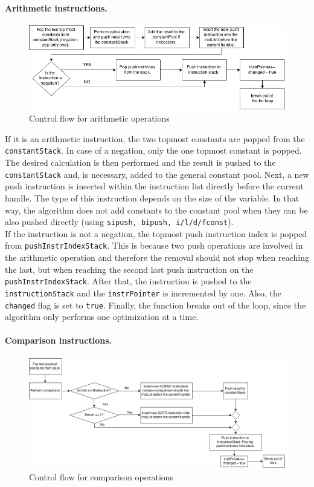 \paragraph{Arithmetic instructions.}
\begin{figure}[h!]
\includegraphics[scale=0.6]{figures/arithmetic}
\caption{Control flow for arithmetic operations}
\end{figure}

If it is an arithmetic instruction, the two topmost constants are popped from the \texttt{constantStack}. In case of a negation, only the one topmost constant is popped. The desired calculation is then performed and the result is pushed to the \texttt{constantStack} and, is necessary, added to the general constant pool. Next, a new push instruction is inserted within the instruction list directly before the current handle. The type of this instruction depends on the size of the variable. In that way, the algorithm does not add constants to the constant pool when they can be also pushed directly (using \texttt{sipush, bipush, i/l/d/fconst}).\\
If the instruction is not a negation, the topmost push instruction index is popped from \texttt{pushInstrIndexStack}. This is because two push operations are involved in the arithmetic operation and therefore the removal should not stop when reaching the last, but when reaching the second last push instruction on the \texttt{pushInstrIndexStack}. After that, the instruction is pushed to the \texttt{instructionStack} and the \texttt{instrPointer} is incremented by one. Also, the \texttt{changed} flag is set to \texttt{true}. Finally, the function breaks out of the loop, since the algorithm only performs one optimization at a time.

\paragraph{Comparison instructions.}
\begin{figure}[h!]
\centering
\includegraphics[scale=0.45]{figures/comparison}
\caption{Control flow for comparison operations}
\end{figure}

